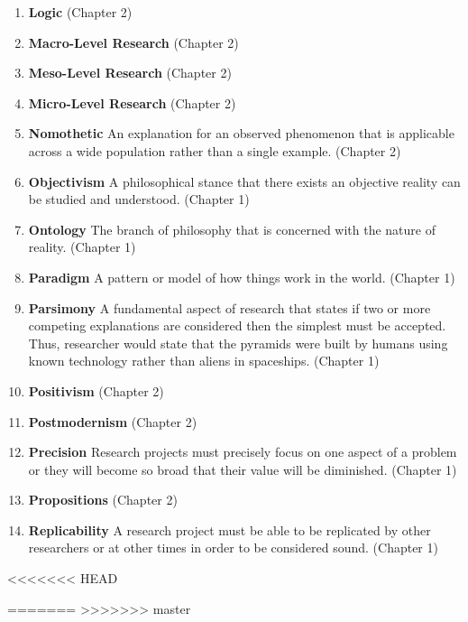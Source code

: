 \begin{enumerate}
	\item \textbf{Logic} (Chapter 2)
	
	\item \textbf{Macro-Level Research} (Chapter 2)
	
	\item \textbf{Meso-Level Research} (Chapter 2)
	
	\item \textbf{Micro-Level Research} (Chapter 2)
	
	\item \textbf{Nomothetic} An explanation for an observed phenomenon that is applicable across a wide population rather than a single example. (Chapter 2)
	
	\item \textbf{Objectivism} A philosophical stance that there exists an objective reality can be studied and understood. (Chapter 1)
	
	\item \textbf{Ontology} The branch of philosophy that is concerned with the nature of reality. (Chapter 1)
	
	\item \textbf{Paradigm} A pattern or model of how things work in the world. (Chapter 1)
	
	\item \textbf{Parsimony} A fundamental aspect of research that states if two or more competing explanations are considered then the simplest must be accepted. Thus, researcher would state that the pyramids were built by humans using known technology rather than aliens in spaceships. (Chapter 1)
	
	\item \textbf{Positivism} (Chapter 2)
	
	\item \textbf{Postmodernism} (Chapter 2)
	
	\item \textbf{Precision} Research projects must precisely focus on one aspect of a problem or they will become so broad that their value will be diminished. (Chapter 1)
	
	\item \textbf{Propositions} (Chapter 2)
	
	\item \textbf{Replicability} A research project must be able to be replicated by other researchers or at other times in order to be considered sound. (Chapter 1)
	
\end{enumerate}


<<<<<<< HEAD

=======
>>>>>>> master









